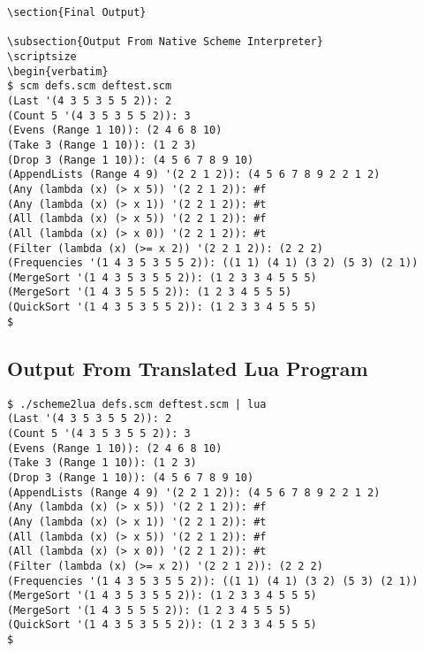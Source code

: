 \begin{verbatim}
\section{Final Output}

\subsection{Output From Native Scheme Interpreter}
\scriptsize
\begin{verbatim}
$ scm defs.scm deftest.scm
(Last '(4 3 5 3 5 5 2)): 2
(Count 5 '(4 3 5 3 5 5 2)): 3
(Evens (Range 1 10)): (2 4 6 8 10)
(Take 3 (Range 1 10)): (1 2 3)
(Drop 3 (Range 1 10)): (4 5 6 7 8 9 10)
(AppendLists (Range 4 9) '(2 2 1 2)): (4 5 6 7 8 9 2 2 1 2)
(Any (lambda (x) (> x 5)) '(2 2 1 2)): #f
(Any (lambda (x) (> x 1)) '(2 2 1 2)): #t
(All (lambda (x) (> x 5)) '(2 2 1 2)): #f
(All (lambda (x) (> x 0)) '(2 2 1 2)): #t
(Filter (lambda (x) (>= x 2)) '(2 2 1 2)): (2 2 2)
(Frequencies '(1 4 3 5 3 5 5 2)): ((1 1) (4 1) (3 2) (5 3) (2 1))
(MergeSort '(1 4 3 5 3 5 5 2)): (1 2 3 3 4 5 5 5)
(MergeSort '(1 4 3 5 5 5 2)): (1 2 3 4 5 5 5)
(QuickSort '(1 4 3 5 3 5 5 2)): (1 2 3 3 4 5 5 5)
$ 
\end{verbatim}
\normalsize

\subsection{Output From Translated Lua Program}
\scriptsize
\begin{verbatim}
$ ./scheme2lua defs.scm deftest.scm | lua
(Last '(4 3 5 3 5 5 2)): 2
(Count 5 '(4 3 5 3 5 5 2)): 3
(Evens (Range 1 10)): (2 4 6 8 10)
(Take 3 (Range 1 10)): (1 2 3)
(Drop 3 (Range 1 10)): (4 5 6 7 8 9 10)
(AppendLists (Range 4 9) '(2 2 1 2)): (4 5 6 7 8 9 2 2 1 2)
(Any (lambda (x) (> x 5)) '(2 2 1 2)): #f
(Any (lambda (x) (> x 1)) '(2 2 1 2)): #t
(All (lambda (x) (> x 5)) '(2 2 1 2)): #f
(All (lambda (x) (> x 0)) '(2 2 1 2)): #t
(Filter (lambda (x) (>= x 2)) '(2 2 1 2)): (2 2 2)
(Frequencies '(1 4 3 5 3 5 5 2)): ((1 1) (4 1) (3 2) (5 3) (2 1))
(MergeSort '(1 4 3 5 3 5 5 2)): (1 2 3 3 4 5 5 5)
(MergeSort '(1 4 3 5 5 5 2)): (1 2 3 4 5 5 5)
(QuickSort '(1 4 3 5 3 5 5 2)): (1 2 3 3 4 5 5 5)
$ 
\end{verbatim}
\normalsize
